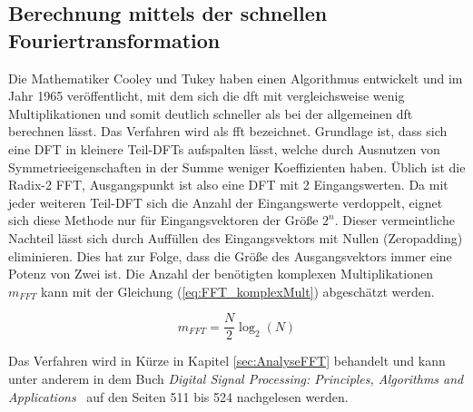 \subsection{Berechnung mittels der schnellen Fouriertransformation}\label{sec:BerechnungFFT}
Die Mathematiker Cooley und Tukey haben einen Algorithmus entwickelt und im Jahr 1965 veröffentlicht, mit dem sich die \gls{dft} mit vergleichsweise wenig Multiplikationen
und somit deutlich schneller als bei der allgemeinen \gls{dft} berechnen lässt. Das Verfahren wird als \gls{fft} bezeichnet.
Grundlage ist, dass sich eine DFT
in kleinere Teil-DFTs aufspalten lässt, welche durch Ausnutzen von Symmetrieeigenschaften in der Summe weniger Koeffizienten haben. 
Üblich ist die Radix-2 FFT, Ausgangspunkt ist also eine DFT mit 2 Eingangswerten.
Da mit jeder weiteren Teil-DFT sich die Anzahl der Eingangswerte verdoppelt, eignet sich diese Methode nur für Eingangsvektoren der Größe $2^n$. Dieser
vermeintliche Nachteil lässt sich durch Auffüllen des Eingangsvektors mit Nullen (Zeropadding) eliminieren. Dies hat zur Folge, dass die Größe des Ausgangsvektors
immer eine Potenz von Zwei ist. 
Die Anzahl der benötigten komplexen Multiplikationen $m_{FFT}$ kann mit der Gleichung (\ref{eq:FFT_komplexMult}) abgeschätzt werden.


\begin{equation}\label{eq:FFT_komplexMult}
 m_{FFT} = \frac{N}{2}\log_2(N)
\end{equation}



Das Verfahren wird in Kürze in Kapitel \ref{sec:AnalyseFFT} behandelt und kann unter anderem in dem Buch 
\textit{Digital Signal Processing: Principles, Algorithms and Applications}~\autocite{john2007digital} auf den Seiten 511 bis 524 nachgelesen werden.